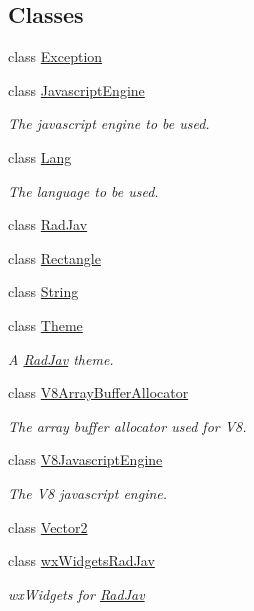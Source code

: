\subsection*{Classes}
\begin{DoxyCompactItemize}
\item 
class \hyperlink{class_rad_j_a_v_1_1_exception}{Exception}
\item 
class \hyperlink{class_rad_j_a_v_1_1_javascript_engine}{Javascript\+Engine}
\begin{DoxyCompactList}\small\item\em The javascript engine to be used. \end{DoxyCompactList}\item 
class \hyperlink{class_rad_j_a_v_1_1_lang}{Lang}
\begin{DoxyCompactList}\small\item\em The language to be used. \end{DoxyCompactList}\item 
class \hyperlink{class_rad_j_a_v_1_1_rad_jav}{Rad\+Jav}
\item 
class \hyperlink{class_rad_j_a_v_1_1_rectangle}{Rectangle}
\item 
class \hyperlink{class_rad_j_a_v_1_1_string}{String}
\item 
class \hyperlink{class_rad_j_a_v_1_1_theme}{Theme}
\begin{DoxyCompactList}\small\item\em A \hyperlink{class_rad_j_a_v_1_1_rad_jav}{Rad\+Jav} theme. \end{DoxyCompactList}\item 
class \hyperlink{class_rad_j_a_v_1_1_v8_array_buffer_allocator}{V8\+Array\+Buffer\+Allocator}
\begin{DoxyCompactList}\small\item\em The array buffer allocator used for V8. \end{DoxyCompactList}\item 
class \hyperlink{class_rad_j_a_v_1_1_v8_javascript_engine}{V8\+Javascript\+Engine}
\begin{DoxyCompactList}\small\item\em The V8 javascript engine. \end{DoxyCompactList}\item 
class \hyperlink{class_rad_j_a_v_1_1_vector2}{Vector2}
\item 
class \hyperlink{class_rad_j_a_v_1_1wx_widgets_rad_jav}{wx\+Widgets\+Rad\+Jav}
\begin{DoxyCompactList}\small\item\em wx\+Widgets for \hyperlink{class_rad_j_a_v_1_1_rad_jav}{Rad\+Jav} \end{DoxyCompactList}\end{DoxyCompactItemize}
